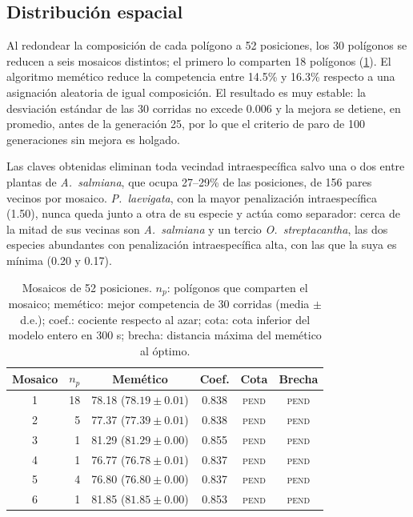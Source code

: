 \subsection{Distribución espacial}
\label{subsec:res-espacial}

Al redondear la composición de cada polígono a 52 posiciones, los 30 polígonos se reducen a seis mosaicos distintos; el primero lo comparten 18 polígonos (\cref{tab:res-mosaicos}). El algoritmo memético reduce la competencia entre 14.5\% y 16.3\% respecto a una asignación aleatoria de igual composición. El resultado es muy estable: la desviación estándar de las 30 corridas no excede 0.006 y la mejora se detiene, en promedio, antes de la generación 25, por lo que el criterio de paro de 100 generaciones sin mejora es holgado.

Las claves obtenidas eliminan toda vecindad intraespecífica salvo una o dos entre plantas de \textit{A.~salmiana}, que ocupa 27--29\% de las posiciones, de 156 pares vecinos por mosaico. \textit{P.~laevigata}, con la mayor penalización intraespecífica (1.50), nunca queda junto a otra de su especie y actúa como separador: cerca de la mitad de sus vecinas son \textit{A.~salmiana} y un tercio \textit{O.~streptacantha}, las dos especies abundantes con penalización intraespecífica alta, con las que la suya es mínima (0.20 y 0.17).

\begin{table}[t]
\centering
\caption{Mosaicos de 52 posiciones. $n_p$: polígonos que comparten el mosaico; memético: mejor competencia de 30 corridas (media $\pm$ d.e.); coef.: cociente respecto al azar; cota: cota inferior del modelo entero en 300 s; brecha: distancia máxima del memético al óptimo.}
\label{tab:res-mosaicos}
\small
\setlength{\tabcolsep}{3pt}
\begin{tabular}{@{}crcccc@{}}
\toprule
Mosaico & $n_p$ & Memético & Coef. & Cota & Brecha \\
\midrule
1 & 18 & 78.18 ($78.19\pm0.01$) & 0.838 & \textsc{pend} & \textsc{pend} \\
2 &  5 & 77.37 ($77.39\pm0.01$) & 0.838 & \textsc{pend} & \textsc{pend} \\
3 &  1 & 81.29 ($81.29\pm0.00$) & 0.855 & \textsc{pend} & \textsc{pend} \\
4 &  1 & 76.77 ($76.78\pm0.01$) & 0.837 & \textsc{pend} & \textsc{pend} \\
5 &  4 & 76.80 ($76.80\pm0.00$) & 0.837 & \textsc{pend} & \textsc{pend} \\
6 &  1 & 81.85 ($81.85\pm0.00$) & 0.853 & \textsc{pend} & \textsc{pend} \\
\bottomrule
\end{tabular}
\end{table}

